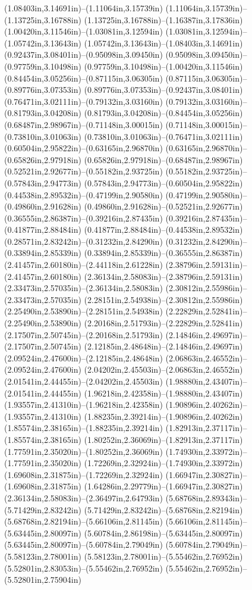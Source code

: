 (1.08403in,3.14691in)--(1.11064in,3.15739in) (1.11064in,3.15739in)--(1.13725in,3.16788in) (1.13725in,3.16788in)--(1.16387in,3.17836in) (1.00420in,3.11546in)--(1.03081in,3.12594in) (1.03081in,3.12594in)--(1.05742in,3.13643in) (1.05742in,3.13643in)--(1.08403in,3.14691in) (0.92437in,3.08401in)--(0.95098in,3.09450in) (0.95098in,3.09450in)--(0.97759in,3.10498in) (0.97759in,3.10498in)--(1.00420in,3.11546in) (0.84454in,3.05256in)--(0.87115in,3.06305in) (0.87115in,3.06305in)--(0.89776in,3.07353in) (0.89776in,3.07353in)--(0.92437in,3.08401in) (0.76471in,3.02111in)--(0.79132in,3.03160in) (0.79132in,3.03160in)--(0.81793in,3.04208in) (0.81793in,3.04208in)--(0.84454in,3.05256in) (0.68487in,2.98967in)--(0.71148in,3.00015in) (0.71148in,3.00015in)--(0.73810in,3.01063in) (0.73810in,3.01063in)--(0.76471in,3.02111in) (0.60504in,2.95822in)--(0.63165in,2.96870in) (0.63165in,2.96870in)--(0.65826in,2.97918in) (0.65826in,2.97918in)--(0.68487in,2.98967in) (0.52521in,2.92677in)--(0.55182in,2.93725in) (0.55182in,2.93725in)--(0.57843in,2.94773in) (0.57843in,2.94773in)--(0.60504in,2.95822in) (0.44538in,2.89532in)--(0.47199in,2.90580in) (0.47199in,2.90580in)--(0.49860in,2.91628in) (0.49860in,2.91628in)--(0.52521in,2.92677in) (0.36555in,2.86387in)--(0.39216in,2.87435in) (0.39216in,2.87435in)--(0.41877in,2.88484in) (0.41877in,2.88484in)--(0.44538in,2.89532in) (0.28571in,2.83242in)--(0.31232in,2.84290in) (0.31232in,2.84290in)--(0.33894in,2.85339in) (0.33894in,2.85339in)--(0.36555in,2.86387in) (2.41457in,2.60180in)--(2.44118in,2.61228in) (2.38796in,2.59131in)--(2.41457in,2.60180in) (2.36134in,2.58083in)--(2.38796in,2.59131in) (2.33473in,2.57035in)--(2.36134in,2.58083in) (2.30812in,2.55986in)--(2.33473in,2.57035in) (2.28151in,2.54938in)--(2.30812in,2.55986in) (2.25490in,2.53890in)--(2.28151in,2.54938in) (2.22829in,2.52841in)--(2.25490in,2.53890in) (2.20168in,2.51793in)--(2.22829in,2.52841in) (2.17507in,2.50745in)--(2.20168in,2.51793in) (2.14846in,2.49697in)--(2.17507in,2.50745in) (2.12185in,2.48648in)--(2.14846in,2.49697in) (2.09524in,2.47600in)--(2.12185in,2.48648in) (2.06863in,2.46552in)--(2.09524in,2.47600in) (2.04202in,2.45503in)--(2.06863in,2.46552in) (2.01541in,2.44455in)--(2.04202in,2.45503in) (1.98880in,2.43407in)--(2.01541in,2.44455in) (1.96218in,2.42358in)--(1.98880in,2.43407in) (1.93557in,2.41310in)--(1.96218in,2.42358in) (1.90896in,2.40262in)--(1.93557in,2.41310in) (1.88235in,2.39214in)--(1.90896in,2.40262in) (1.85574in,2.38165in)--(1.88235in,2.39214in) (1.82913in,2.37117in)--(1.85574in,2.38165in) (1.80252in,2.36069in)--(1.82913in,2.37117in) (1.77591in,2.35020in)--(1.80252in,2.36069in) (1.74930in,2.33972in)--(1.77591in,2.35020in) (1.72269in,2.32924in)--(1.74930in,2.33972in) (1.69608in,2.31875in)--(1.72269in,2.32924in) (1.66947in,2.30827in)--(1.69608in,2.31875in) (1.64286in,2.29779in)--(1.66947in,2.30827in) (2.36134in,2.58083in)--(2.36497in,2.64793in) (5.68768in,2.89343in)--(5.71429in,2.83242in) (5.71429in,2.83242in)--(5.68768in,2.82194in) (5.68768in,2.82194in)--(5.66106in,2.81145in) (5.66106in,2.81145in)--(5.63445in,2.80097in) (5.60784in,2.86198in)--(5.63445in,2.80097in) (5.63445in,2.80097in)--(5.60784in,2.79049in) (5.60784in,2.79049in)--(5.58123in,2.78001in) (5.58123in,2.78001in)--(5.55462in,2.76952in) (5.52801in,2.83053in)--(5.55462in,2.76952in) (5.55462in,2.76952in)--(5.52801in,2.75904in) 